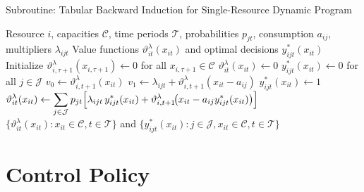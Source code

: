 \documentclass[11pt]{article}
\begin{document}
\begin{algorithm}
\caption{Subroutine: Tabular Backward Induction for Single-Resource Dynamic Program}
\begin{algorithmic}[1]
\Require Resource $i$, capacities $\mathcal{C}$, time periods $\mathcal{T}$, probabilities $p_{jt}$, consumption $a_{ij}$, multipliers $\lambda_{ijt}$
\Ensure Value functions $\vartheta^\lambda_{it}(x_{it})$ and optimal decisions $y^*_{ijt}(x_{it})$
\State Initialize $\vartheta^\lambda_{i,\tau+1}(x_{i,\tau+1}) \gets 0$ for all $x_{i,\tau+1} \in \mathcal{C}$ 
 
     
        \State $\vartheta^\lambda_{it}(x_{it}) \gets 0$
        \State $y^*_{ijt}(x_{it}) \gets 0$ for all $j \in \mathcal{J}$ 
         
             
                \State $v_0 \gets \vartheta^\lambda_{i,t+1}(x_{it})$ 
                \State $v_1 \gets \lambda_{ijt} + \vartheta^\lambda_{i,t+1}(x_{it} - a_{ij})$ 
                    \State $y^*_{ijt}(x_{it}) \gets 1$ 
                \EndIf
            \EndIf
        \EndFor
        \State $\displaystyle \vartheta^\lambda_{it}(x_{it}) \gets \sum_{j\in\mathcal{J}} p_{jt}\Bigl[ \lambda_{ijt}\,y^*_{ijt}(x_{it}) + \vartheta^\lambda_{i,t+1}\!\bigl(x_{it}-a_{ij}y^*_{ijt}(x_{it})\bigr) \Bigr]$
    \EndFor
\EndFor
\State \Return $\{\vartheta^\lambda_{it}(x_{it}): x_{it} \in \mathcal{C}, t \in \mathcal{T}\}$ and $\{y^*_{ijt}(x_{it}): j \in \mathcal{J}, x_{it} \in \mathcal{C}, t \in \mathcal{T}\}$
\end{algorithmic}
\end{algorithm}

\vspace{0.5cm}





\section{Control Policy}
\end{document}
